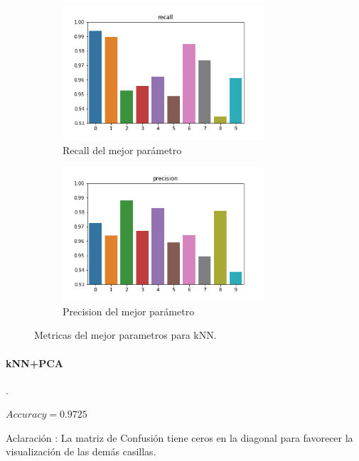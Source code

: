 \begin{figure}[H]
\begin{subfigure}{0.5\textwidth}
\includegraphics[width=0.9\linewidth, height=5cm]{images/recall_knn.png} 
\caption{Recall del mejor parámetro}
\end{subfigure}
\begin{subfigure}{0.5\textwidth}
\includegraphics[width=0.9\linewidth, height=5cm]{images/precision_knn.png} 
\caption{Precision del mejor parámetro}
\end{subfigure}
\caption{Metricas del mejor parametros para kNN.}
\label{knn_metricas}%
\end{figure}





\paragraph{kNN+PCA}.


\vspace{0.5cm}
$Accuracy = 0.9725 $
\par
\vspace{0.5cm}
Aclaración : La matriz de Confusión tiene ceros en la diagonal para favorecer la visualización de las demás casillas.

